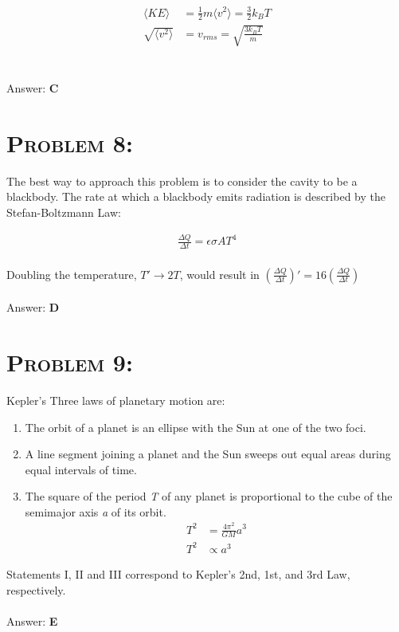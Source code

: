 \documentclass{article}
\begin{document}
\begin{align}
\langle{KE}\rangle &= \frac{1}{2}m \langle{v^2}\rangle= \frac{3}{2} k_B T\\
\sqrt{\langle{v^2}\rangle} &= v_{rms} = \boxed{\sqrt{\frac{3 k_B T}{m}}}
\end{align}
\\\\
Answer: \textbf{\textcolor{ProcessBlue}C}\\


\section{\textsc{Problem 8:}}  The best way to approach this problem is to consider the cavity to be a blackbody. The rate at which a blackbody emits radiation is described by the Stefan-Boltzmann Law:

\begin{gather}
\frac{\Delta Q}{\Delta t} = \epsilon \sigma A T^4
\end{gather}
\\
Doubling the temperature, \textit{$T' \rightarrow 2T$}, would result in $\left(\frac{\Delta Q}{\Delta t}\right)' = 16\left(\frac{\Delta Q}{\Delta t}\right)$
\\\\
Answer: \textbf{\textcolor{ProcessBlue}D}\\


\section{\textsc{Problem 9:}}  Kepler's Three laws of planetary motion are:

\begin{enumerate}
\item The orbit of a planet is an ellipse with the Sun at one of the two foci.
\item A line segment joining a planet and the Sun sweeps out equal areas during equal intervals of time.
\item The square of the period \textit{T} of any planet is proportional to the cube of the semimajor axis  \textit{a} of its orbit.
\begin{align}
T^2 &= \frac{4\pi^2}{GM}a^3\\
T^2 &\propto a^3
\end{align}
\end{enumerate}
Statements I, II and III correspond to Kepler's 2nd, 1st, and 3rd Law, respectively.
\\\\
Answer: \textbf{\textcolor{ProcessBlue}E}\\
\end{document}
